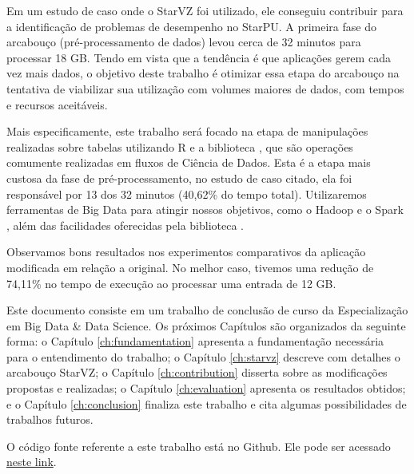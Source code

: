 Em um estudo de caso onde o StarVZ foi utilizado, ele conseguiu contribuir para 
a identificação de problemas de desempenho no StarPU. A primeira fase do 
arcabouço (pré-processamento de dados) levou cerca de 32 minutos para processar 
18 GB. Tendo em vista que a tendência é que aplicações gerem cada vez mais 
dados, o objetivo deste trabalho é otimizar essa etapa do arcabouço na tentativa 
de viabilizar sua utilização com volumes maiores de dados, com tempos e 
recursos aceitáveis.

Mais especificamente, este trabalho será focado na etapa de manipulações 
realizadas sobre tabelas utilizando R e a biblioteca , 
que são operações comumente realizadas em fluxos de Ciência de Dados. Esta 
é a etapa mais custosa da fase de pré-processamento, no estudo de caso citado, 
ela foi responsável por 13 dos 32 minutos (40,62\% do tempo total). 
Utilizaremos ferramentas de Big Data para atingir nossos objetivos, como o 
Hadoop \cite{ref:hadoopbook} e o Spark \cite{ref:sparkbook}, além das 
facilidades oferecidas pela biblioteca . 

Observamos bons resultados nos experimentos comparativos da aplicação 
modificada em relação a original. No melhor caso, tivemos uma redução de 
74,11\% no tempo de execução ao processar uma entrada de 12 GB.

Este documento consiste em um trabalho de conclusão de curso da Especialização 
em Big Data \& Data Science. Os próximos Capítulos são organizados da seguinte 
forma: o Capítulo \ref{ch:fundamentation} apresenta a fundamentação necessária 
para o entendimento do trabalho; o Capítulo \ref{ch:starvz} descreve com 
detalhes o arcabouço StarVZ; o Capítulo \ref{ch:contribution} disserta sobre as 
modificações propostas e realizadas; o Capítulo \ref{ch:evaluation} apresenta 
os resultados obtidos; e o Capítulo \ref{ch:conclusion} finaliza este trabalho e 
cita algumas possibilidades de trabalhos futuros.

O código fonte referente a este trabalho está no Github. Ele pode ser acessado 
\href{https://github.com/aksmiyazaki/starvz/tree/spark_starvz}{neste link}.

